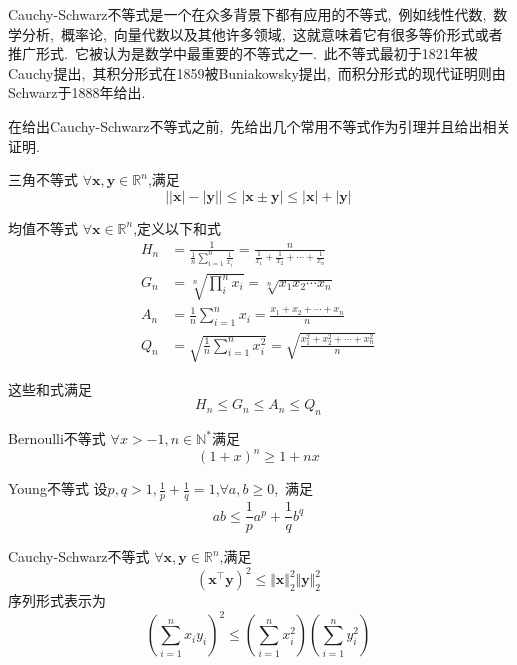 Cauchy-Schwarz不等式是一个在众多背景下都有应用的不等式,\ 例如线性代数,\ 数学分析,\ 概率论,\ 向量代数以及其他许多领域,\ 这就意味着它有很多等价形式或者推广形式.\ 它被认为是数学中最重要的不等式之一.\ 此不等式最初于1821年被Cauchy提出,\ 其积分形式在1859被Buniakowsky提出,\ 而积分形式的现代证明则由Schwarz于1888年给出.\ 

在给出Cauchy-Schwarz不等式之前,\ 先给出几个常用不等式作为引理并且给出相关证明.\ 
\begin{lemma}{三角不等式}
$\forall \boldsymbol{x},\boldsymbol{y}\in\mathbb{R}^n$,满足
\begin{equation}
\lvert\lvert\boldsymbol{x}\rvert-\lvert\boldsymbol{y}\rvert\rvert\leqslant\lvert\boldsymbol{x}\pm\boldsymbol{y}\rvert\leqslant\lvert\boldsymbol{x}\rvert+\lvert\boldsymbol{y}\rvert~
\end{equation}
\end{lemma}
\begin{lemma}{均值不等式}
$\forall \boldsymbol{x}\in\mathbb{R}^n$,定义以下和式
\begin{align}
H_n&=\frac{1}{\frac{1}{n}\sum\limits_{i=1}^n\frac{1}{x_i}}=\frac{n}{\frac{1}{x_1}+\frac{1}{x_2}+\cdots+\frac{1}{x_n}}\\
G_n&=\sqrt[n]{\prod_{i}^n x_i}=\sqrt[n]{x_1x_2\cdots x_n}\\
A_n&=\frac{1}{n}\sum_{i=1}^n x_i=\frac{x_1+x_2+\cdots+x_n}{n}\\
Q_n&=\sqrt{\frac{1}{n}\sum_{i=1}^n x_i^2}=\sqrt{\frac{x_1^2+x_2^2+\cdots+x_n^2}{n}}~
\end{align}
\end{lemma}
这些和式满足
\begin{equation}
H_n\leqslant G_n\leqslant A_n \leqslant Q_n~
\end{equation}
\begin{lemma}{Bernoulli不等式}
$\forall x > -1,n \in \mathbb{N}^{\ast}$满足
\begin{equation}
(1+x)^n \geq 1+nx~
\end{equation}
\end{lemma}
\begin{lemma}{Young不等式}
设$p,q>1,\frac{1}{p}+\frac{1}{q}=1$,$\forall a,b\geqslant 0$,\ 满足 
\begin{equation}
a b \leqslant \frac{1}{p}a^{p}+\frac{1}{q}b^{q}~
\end{equation}
\end{lemma}
\begin{theorem}{Cauchy-Schwarz不等式}
$\forall \boldsymbol{x},\boldsymbol{y}\in\mathbb{R}^n$,满足
\begin{equation}
(\boldsymbol{x}^{\top}\boldsymbol{y})^2\leqslant \Vert \boldsymbol{x}\Vert_2^2\Vert \boldsymbol{y}\Vert_2^2~
\end{equation}
序列形式表示为
\begin{equation}
\left(\sum_{i=1}^{n}x_iy_i\right)^2\leqslant \left(\sum_{i=1}^nx_i^2\right)\left(\sum_{i=1}^ny_i^2\right)~
\end{equation}
\end{theorem}